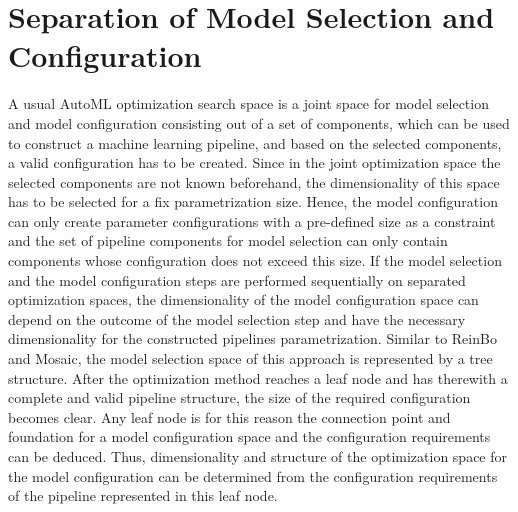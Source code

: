 \section{Separation of Model Selection and Configuration}
\label{sec:approach:separation}
A usual AutoML optimization search space is a joint space for model selection and model configuration consisting out of a set of components, which can be used to construct a machine learning pipeline, and based on the selected components, a valid configuration has to be created.
Since in the joint optimization space the selected components are not known beforehand, the dimensionality of this space has to be selected for a fix parametrization size.
Hence, the model configuration can only create parameter configurations with a pre-defined size as a constraint and the set of pipeline components for model selection can only contain components whose configuration does not exceed this size.\newline
If the model selection and the model configuration steps are performed sequentially on separated optimization spaces, the dimensionality of the model configuration space can depend on the outcome of the model selection step and have the necessary dimensionality for the constructed pipelines parametrization.\newline
Similar to ReinBo and Mosaic, the model selection space of this approach is represented by a tree structure.
After the optimization method reaches a leaf node and has therewith a complete and valid pipeline structure, the size of the required configuration becomes clear.
Any leaf node is for this reason the connection point and foundation for a model configuration space and the configuration requirements can be deduced.
Thus, dimensionality and structure of the optimization space for the model configuration can be determined from the configuration requirements of the pipeline represented in this leaf node.


